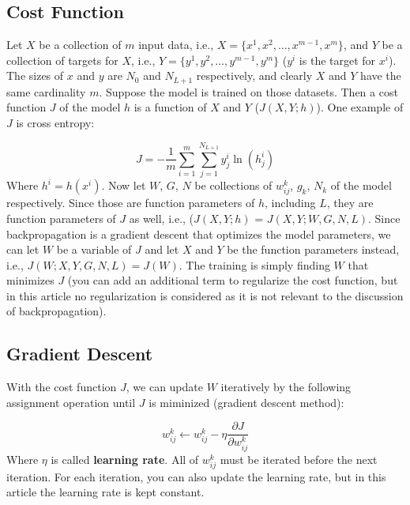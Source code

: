 \documentclass[letterpaper, 11pt]{article}
\newcommand{\pd}[2]{\frac{\partial#1}{\partial#2}}
\newcommand{\w}{w^{k}_{ij}}
\numberwithin{equation}{section}
\numberwithin{figure}{section}
\numberwithin{table}{section}
\begin{document}
\subsection{Cost Function}
Let \(X\) be a collection of \(m\) input data, i.e., \(X = \{x^{1}, x^{2}, \dots, x^{m-1}, x^{m}\}\), and \(Y\) be a collection of targets for \(X\), i.e., \(Y =\{y^{1}, y^{2}, \dots, y^{m-1}, y^{m}\}\) (\(y^{i}\) is the target for \(x^{i}\)). The sizes of \(x\) and \(y\) are \(N_{0}\) and \(N_{L+1}\) respectively, and clearly \(X\) and \(Y\) have the same cardinality \(m\). Suppose the model is trained on those datasets. Then a cost function \(J\) of the model \(h\) is a function of \(X\) and \(Y\) (\(J(X,Y;h)\)). One example of \(J\) is cross entropy:

\begin{equation}
	J = -\frac{1}{m} \sum_{i=1}^{m} \sum_{j=1}^{N_{L+1}}y^{i}_{j}\ln(h^{i}_{j})	
\end{equation}
Where \(h^{i} = h(x^{i})\). Now let \(W\), \(G\), \(N\) be collections of \(\w\), \(g_{k}\), \(N_{k}\) of the model respectively. Since those are function parameters of \(h\), including \(L\), they are function parameters of \(J\) as well, i.e., (\(J(X,Y;h)\) = \(J(X,Y;W,G,N,L)\). Since backpropagation is a gradient descent that optimizes the model parameters, we can let \(W\) be a variable of \(J\) and let \(X\) and \(Y\) be the function parameters instead, i.e., \(J(W;X,Y,G,N,L) = J(W)\). The training is simply finding \(W\) that minimizes \(J\) (you can add an additional term to regularize the cost function, but in this article no regularization is considered as it is not relevant to the discussion of backpropagation). 

\subsection{Gradient Descent}
With the cost function \(J\), we can update \(W\) iteratively by the following assignment operation until \(J\) is miminized (gradient descent method): 

\begin{equation}
	w^{k}_{ij} \leftarrow  w^{k}_{ij} - \eta \pd{J}{\w}\label{gradient}
\end{equation}
Where \(\eta\) is called \textbf{learning rate}. All of \(\w\) must be iterated before the next iteration. For each iteration, you can also update the learning rate, but in this article the learning rate is kept constant. 
\end{document}
